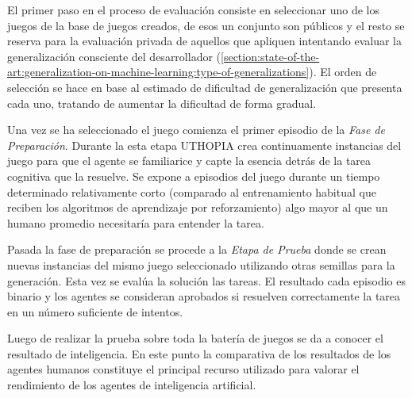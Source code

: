 El primer paso en el proceso de evaluación consiste en seleccionar uno de los juegos de la base de juegos creados, de esos un conjunto son públicos y el resto se reserva para la evaluación privada de aquellos que apliquen intentando evaluar la generalización consciente del desarrollador (\ref{section:state-of-the-art:generalization-on-machine-learning:type-of-generalizations}). El orden de selección se hace en base al estimado de dificultad de generalización que presenta cada uno, tratando de aumentar la dificultad de forma gradual.

Una vez se ha seleccionado el juego comienza el primer episodio de la \textit{Fase de Preparación}. Durante la esta etapa UTHOPIA crea continuamente instancias del juego para que el agente se familiarice y capte la esencia detrás de la tarea cognitiva que la resuelve. Se expone a episodios del juego durante un tiempo determinado relativamente corto (comparado al entrenamiento habitual que reciben los algoritmos de aprendizaje por reforzamiento) algo mayor al que un humano promedio necesitaría para entender la tarea.

Pasada la fase de preparación se procede a la \textit{Etapa de Prueba} donde se crean nuevas instancias del mismo juego seleccionado utilizando otras semillas para la generación. Esta vez se evalúa la solución las tareas. El resultado cada episodio es binario y los agentes se consideran aprobados si resuelven correctamente la tarea en un número suficiente de intentos.

Luego de realizar la prueba sobre toda la batería de juegos se da a conocer el resultado de inteligencia. En este punto la comparativa de los resultados de los agentes humanos constituye el principal recurso utilizado para valorar el rendimiento de los agentes de inteligencia artificial.



